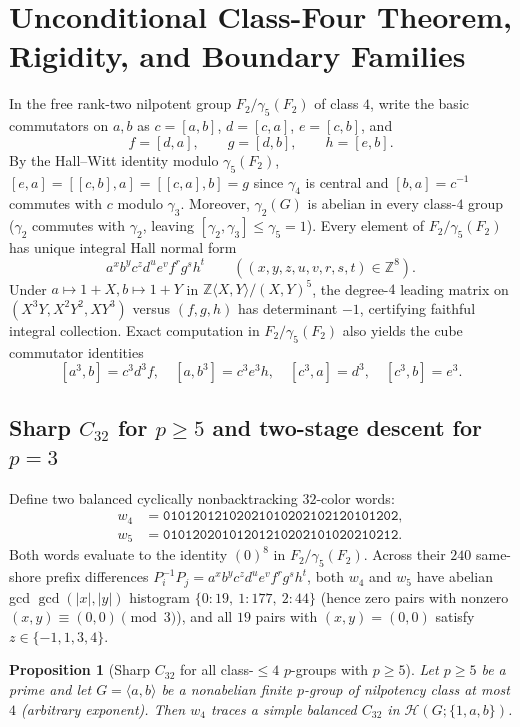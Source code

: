 \documentclass[11pt]{amsart}
\newtheorem{proposition}[theorem]{Proposition}
\theoremstyle{definition}
\theoremstyle{remark}
\newcommand{\Z}{\mathbb{Z}}
\newcommand{\Haar}{\mathcal{H}}
\begin{document}
\section{Unconditional Class-Four Theorem, Rigidity, and Boundary Families}\label{sec:class4}

In the free rank-two nilpotent group $F_2/\gamma_5(F_2)$ of class $4$, write the basic commutators on $a, b$ as $c = [a,b]$, $d = [c,a]$, $e = [c,b]$, and
\[
f = [d,a],\qquad g = [d,b],\qquad h = [e,b].
\]
By the Hall--Witt identity modulo $\gamma_5(F_2)$, $[e,a] = [[c,b],a] = [[c,a],b] = g$ since $\gamma_4$ is central and $[b,a] = c^{-1}$ commutes with $c$ modulo $\gamma_3$. Moreover, $\gamma_2(G)$ is abelian in every class-$4$ group ($\gamma_2$ commutes with $\gamma_2$, leaving $[\gamma_2, \gamma_3] \le \gamma_5 = 1$). Every element of $F_2/\gamma_5(F_2)$ has unique integral Hall normal form
\[
a^x b^y c^z d^u e^v f^r g^s h^t \qquad ((x,y,z,u,v,r,s,t) \in \Z^8).
\]
Under $a \mapsto 1+X, b \mapsto 1+Y$ in $\Z\langle X,Y\rangle/(X,Y)^5$, the degree-$4$ leading matrix on $(X^3 Y, X^2 Y^2, X Y^3)$ versus $(f, g, h)$ has determinant $-1$, certifying faithful integral collection. Exact computation in $F_2/\gamma_5(F_2)$ also yields the cube commutator identities
\begin{equation}\label{eq:cube_comm_4}
[a^3, b] = c^3 d^3 f,\quad [a, b^3] = c^3 e^3 h,\quad [c^3, a] = d^3,\quad [c^3, b] = e^3.
\end{equation}

\subsection{Sharp $C_{32}$ for $p \ge 5$ and two-stage descent for $p = 3$}

Define two balanced cyclically nonbacktracking $32$-color words:
\begin{align*}
w_4 &= \mathtt{01012012102021010202102120101202}, \\
w_5 &= \mathtt{01012020101201210202101020210212}.
\end{align*}
Both words evaluate to the identity $(0)^8$ in $F_2/\gamma_5(F_2)$. Across their $240$ same-shore prefix differences $P_i^{-1} P_j = a^x b^y c^z d^u e^v f^r g^s h^t$, both $w_4$ and $w_5$ have abelian gcd $\gcd(|x|, |y|)$ histogram $\{0:19,\ 1:177,\ 2:44\}$ (hence zero pairs with nonzero $(x,y) \equiv (0,0) \pmod 3$), and all $19$ pairs with $(x,y)=(0,0)$ satisfy $z \in \{-1, 1, 3, 4\}$.

\begin{proposition}[Sharp $C_{32}$ for all class-$\le 4$ $p$-groups with $p \ge 5$]\label{prop:class4_pge5_c32}
Let $p \ge 5$ be a prime and let $G = \langle a, b \rangle$ be a nonabelian finite $p$-group of nilpotency class at most $4$ (arbitrary exponent). Then $w_4$ traces a simple balanced $C_{32}$ in $\Haar(G; \{1,a,b\})$.
\end{proposition}
\end{document}
